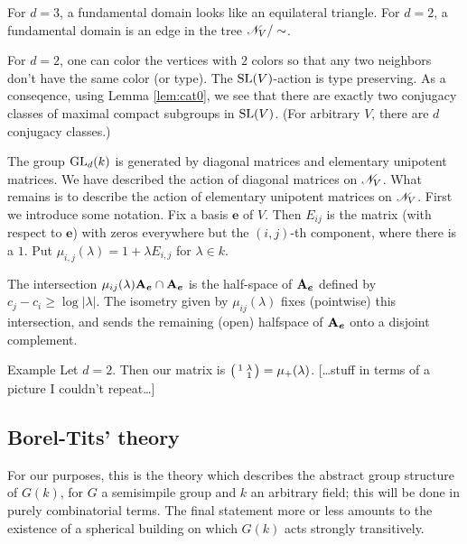 For $d=3$, a fundamental domain looks like an equilateral triangle. For 
$d=2$, a fundamental domain is an edge in the tree 
$\mathscr{N}_V/\sim$. 

For $d=2$, one can color the vertices with $2$ colors so that any two neighbors 
don't have the same color (or type). The 
$\operatorname{SL}(V)$-action is type preserving. As a conseqence, using 
Lemma \ref{lem:cat0}, we see that there are exactly two conjugacy classes of 
maximal compact subgroups in $\operatorname{SL}(V)$. (For arbitrary $V$, there are 
$d$ conjugacy classes.) 

The group $\operatorname{GL}_d(k)$ is generated by diagonal matrices and elementary 
unipotent matrices. We have described the action of diagonal matrices on 
$\mathscr{N}_V$. What remains is to describe the action of elementary unipotent matrices 
on $\mathscr{N}_V$. First we introduce some notation. Fix a basis 
$\boldsymbol e$ of $V$. Then $E_{i j}$ is the matrix (with respect to 
$\boldsymbol e$) with zeros everywhere but the $(i,j)$-th component, where there 
is a $1$. Put $\mu_{i,j}(\lambda) = 1+\lambda E_{i,j}$ for 
$\lambda\in k$. 

\begin{prop}
The intersection 
$\mu_{i j}(\lambda) \mathbf{A}_{\boldsymbol e} \cap \mathbf{A}_{\boldsymbol e}$ is the half-space 
of $\mathbf{A}_{\boldsymbol e}$ defined by 
$c_j-c_i \geqslant \log |\lambda|$. The isometry given by 
$\mu_{i j}(\lambda)$ fixes (pointwise) this intersection, and sends the remaining 
(open) halfspace of $\mathbf{A}_{\boldsymbol e}$ onto a disjoint complement. 
\end{prop}

\begin{enonce}{Example}
Let $d=2$. Then our matrix is $\bigl(\begin{smallmatrix} 1 & \lambda \\  & 1 \end{smallmatrix} \bigr) = \mu_+(\lambda)$. 
[\ldots stuff in terms of a picture I couldn't repeat\ldots]
\end{enonce}





\subsection{Borel-Tits' theory}

For our purposes, this is the theory which describes the abstract group structure 
of $G(k)$, for $G$ a semisimpile group and $k$ an arbitrary field; this will be done in 
purely combinatorial terms. The final statement more or less amounts to the existence 
of a spherical building on which $G(k)$ acts strongly transitively. 


